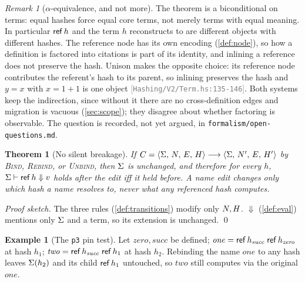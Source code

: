 \documentclass[11pt]{article}
\theoremstyle{definition}
\newtheorem{example}{Example}[section]
\theoremstyle{plain}
\newtheorem{theorem}{Theorem}[section]
\theoremstyle{remark}
\newtheorem{remark}{Remark}[section]
\newcommand{\src}[1]{{\footnotesize\textcolor{gray}{[\texttt{#1}]}}}
\begin{document}
\begin{remark}[$\alpha$-equivalence, and not more]\label{rem:alpha-only}
The theorem is a biconditional on terms: equal hashes force equal core terms, not merely terms
with equal meaning. In particular $\mathsf{ref}\,h$ and the term $h$ reconstructs to are different
objects with different hashes. The reference node has its own encoding (\cref{def:node}), so
how a definition is factored into citations is part of its identity, and inlining a reference
does not preserve the hash. Unison makes the opposite choice: its reference node contributes the
referent's hash to its parent, so inlining preserves the hash and $y = x$ with
$x = 1{+}1$ is one object \src{Hashing/V2/Term.hs:135-146}. Both systems keep the indirection,
since without it there are no cross-definition edges and migration is vacuous
(\cref{sec:scope}); they disagree about whether factoring is observable. The question is
recorded, not yet argued, in \texttt{formalism/open-questions.md}.
\end{remark}

\begin{theorem}[No silent breakage]\label{thm:nsb}
If $C = \langle \Sigma,\, N,\, E,\, H\rangle \longrightarrow \langle \Sigma,\, N',\, E,\, H'\rangle$
by \textsc{Bind}, \textsc{Rebind}, or \textsc{Unbind}, then $\Sigma$ is unchanged, and therefore
for every $h$, $\Sigma \vdash \mathsf{ref}\,h \Downarrow v$ holds after the edit iff it held before. A name
edit changes only which hash a name resolves to, never what any referenced hash computes.
\end{theorem}
\begin{proof}[Proof sketch]
The three rules (\cref{def:transitions}) modify only $N,H$. $\Downarrow$
(\cref{def:eval}) mentions only $\Sigma$ and a term, so its extension is unchanged. \qed
\end{proof}

\begin{example}[The \texttt{p3} pin test]\label{ex:nsb}
Let $\mathit{zero},\mathit{succ}$ be defined; $\mathit{one} = \mathsf{ref}\,h_{\mathit{succ}}\;\mathsf{ref}\,h_{\mathit{zero}}$ at hash $h_1$; $\mathit{two} = \mathsf{ref}\,h_{\mathit{succ}}\;\mathsf{ref}\,h_1$ at hash $h_2$. Rebinding the name $\mathit{one}$ to any hash leaves $\Sigma(h_2)$
and its child $\mathsf{ref}\,h_1$ untouched, so $\mathit{two}$ still computes via the original
$\mathit{one}$.
\end{example}
\end{document}
